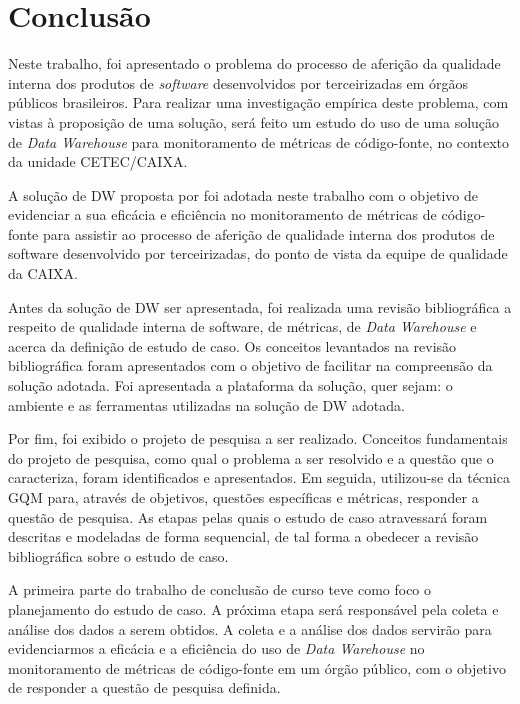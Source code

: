 \chapter{Conclusão}

Neste trabalho, foi apresentado o problema do processo de aferição da qualidade interna dos produtos de \textit{software} desenvolvidos por terceirizadas em órgãos públicos brasileiros. Para realizar uma investigação empírica deste problema, com vistas à proposição de uma solução, será feito um estudo do uso de uma solução de \textit{Data Warehouse} para monitoramento de métricas de código-fonte, no contexto da unidade CETEC/CAIXA.

A solução de DW proposta por  foi adotada neste trabalho com o objetivo de evidenciar a sua eficácia e eficiência no monitoramento de métricas de código-fonte para assistir ao processo de aferição de qualidade interna dos produtos de software desenvolvido por terceirizadas, do ponto de vista da equipe de qualidade da CAIXA. 

Antes da solução de DW ser apresentada, foi realizada uma revisão bibliográfica a respeito de qualidade interna de software, de métricas, de \textit{Data Warehouse} e acerca da definição de estudo de caso. Os conceitos levantados na revisão bibliográfica foram apresentados com o objetivo de facilitar na compreensão da solução adotada. Foi apresentada a plataforma da solução, quer sejam: o ambiente e as ferramentas utilizadas na solução de DW adotada. 

Por fim, foi  exibido o projeto de pesquisa a ser realizado. Conceitos fundamentais do projeto de pesquisa, como qual o problema a ser resolvido e a questão que o caracteriza, foram identificados e apresentados. Em seguida, utilizou-se da  técnica GQM para, através de objetivos, questões específicas e métricas, responder a questão de pesquisa. As etapas pelas quais o estudo de caso atravessará foram descritas e modeladas de forma sequencial, de tal forma a obedecer a revisão bibliográfica sobre o estudo de caso.

A primeira parte do trabalho de conclusão de curso teve como foco o planejamento do estudo de caso. A próxima etapa será responsável pela coleta e análise dos dados a serem obtidos. A coleta e a análise dos dados servirão para evidenciarmos a eficácia e a eficiência do uso de \textit{Data Warehouse} no monitoramento de métricas de código-fonte em um órgão público, com o objetivo de responder a questão de pesquisa definida.

